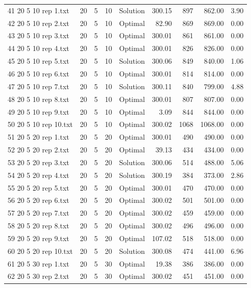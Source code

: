 \begin{longtable}{lrrllrrrr}
41 20 5 10 rep 1.txt & 20 & 5 & 10 & Solution & 300.15 & 897 & 862.00 &  3.90\\
42 20 5 10 rep 2.txt & 20 & 5 & 10 & Optimal & 82.90 & 869 & 869.00 &  0.00\\
43 20 5 10 rep 3.txt & 20 & 5 & 10 & Optimal & 300.01 & 861 & 861.00 &  0.00\\
44 20 5 10 rep 4.txt & 20 & 5 & 10 & Optimal & 300.01 & 826 & 826.00 &  0.00\\
45 20 5 10 rep 5.txt & 20 & 5 & 10 & Solution & 300.06 & 849 & 840.00 &  1.06\\
46 20 5 10 rep 6.txt & 20 & 5 & 10 & Optimal & 300.01 & 814 & 814.00 &  0.00\\
47 20 5 10 rep 7.txt & 20 & 5 & 10 & Solution & 300.11 & 840 & 799.00 &  4.88\\
48 20 5 10 rep 8.txt & 20 & 5 & 10 & Optimal & 300.01 & 807 & 807.00 &  0.00\\
49 20 5 10 rep 9.txt & 20 & 5 & 10 & Optimal &  3.09 & 844 & 844.00 &  0.00\\
50 20 5 10 rep 10.txt & 20 & 5 & 10 & Optimal & 300.02 & 1068 & 1068.00 &  0.00\\
51 20 5 20 rep 1.txt & 20 & 5 & 20 & Optimal & 300.01 & 490 & 490.00 &  0.00\\
52 20 5 20 rep 2.txt & 20 & 5 & 20 & Optimal & 39.13 & 434 & 434.00 &  0.00\\
53 20 5 20 rep 3.txt & 20 & 5 & 20 & Solution & 300.06 & 514 & 488.00 &  5.06\\
54 20 5 20 rep 4.txt & 20 & 5 & 20 & Solution & 300.19 & 384 & 373.00 &  2.86\\
55 20 5 20 rep 5.txt & 20 & 5 & 20 & Optimal & 300.01 & 470 & 470.00 &  0.00\\
56 20 5 20 rep 6.txt & 20 & 5 & 20 & Optimal & 300.02 & 501 & 501.00 &  0.00\\
57 20 5 20 rep 7.txt & 20 & 5 & 20 & Optimal & 300.02 & 459 & 459.00 &  0.00\\
58 20 5 20 rep 8.txt & 20 & 5 & 20 & Optimal & 300.02 & 496 & 496.00 &  0.00\\
59 20 5 20 rep 9.txt & 20 & 5 & 20 & Optimal & 107.02 & 518 & 518.00 &  0.00\\
60 20 5 20 rep 10.txt & 20 & 5 & 20 & Solution & 300.08 & 474 & 441.00 &  6.96\\
61 20 5 30 rep 1.txt & 20 & 5 & 30 & Optimal & 19.38 & 386 & 386.00 &  0.00\\
62 20 5 30 rep 2.txt & 20 & 5 & 30 & Optimal & 300.02 & 451 & 451.00 &  0.00\\

\end{longtable}
